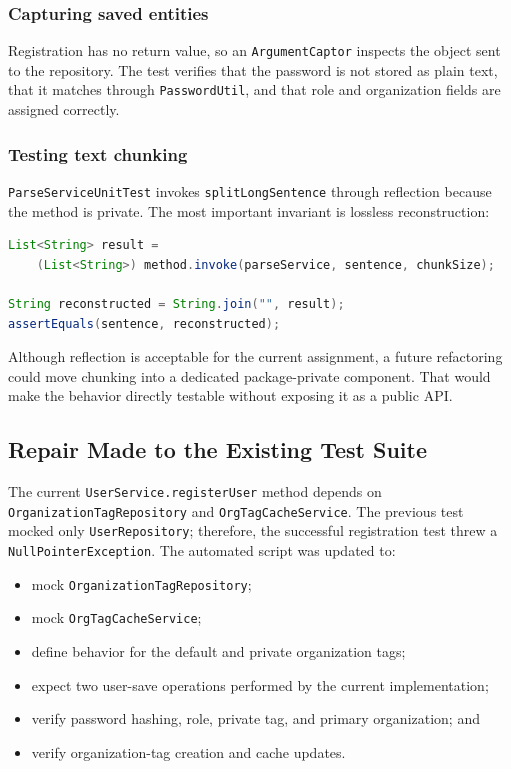 \documentclass[11pt,a4paper]{article}
\begin{document}
\subsubsection{Capturing saved entities}

Registration has no return value, so an \texttt{ArgumentCaptor} inspects the object sent
to the repository. The test verifies that the password is not stored as plain text,
that it matches through \texttt{PasswordUtil}, and that role and organization fields
are assigned correctly.

\subsubsection{Testing text chunking}

\texttt{ParseServiceUnitTest} invokes \texttt{splitLongSentence} through reflection
because the method is private. The most important invariant is lossless reconstruction:
\begin{lstlisting}[language=Java]
List<String> result =
    (List<String>) method.invoke(parseService, sentence, chunkSize);

String reconstructed = String.join("", result);
assertEquals(sentence, reconstructed);
\end{lstlisting}

Although reflection is acceptable for the current assignment, a future refactoring
could move chunking into a dedicated package-private component. That would make the
behavior directly testable without exposing it as a public API.

\subsection{Repair Made to the Existing Test Suite}

The current \texttt{UserService.registerUser} method depends on
\texttt{OrganizationTagRepository} and \texttt{OrgTagCacheService}. The previous test
mocked only \texttt{UserRepository}; therefore, the successful registration test threw
a \texttt{NullPointerException}. The automated script was updated to:
\begin{itemize}[leftmargin=2em]
  \item mock \texttt{OrganizationTagRepository};
  \item mock \texttt{OrgTagCacheService};
  \item define behavior for the default and private organization tags;
  \item expect two user-save operations performed by the current implementation;
  \item verify password hashing, role, private tag, and primary organization; and
  \item verify organization-tag creation and cache updates.
\end{itemize}
\end{document}
